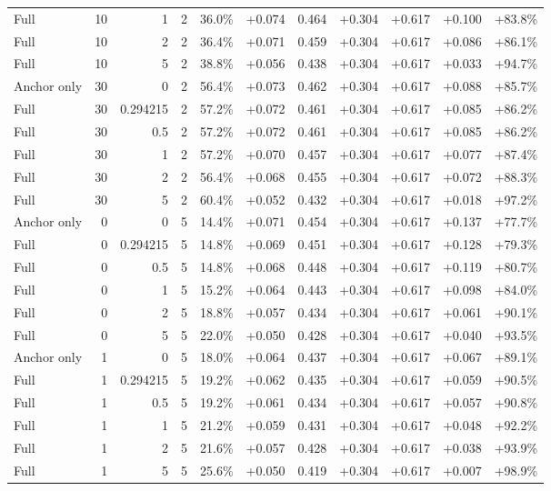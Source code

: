 \begin{table}[htbp]
\begin{tabular}{lrrrccccccc}
Full & 10 & 1 & 2 & 36.0\% & +0.074 & 0.464 & +0.304 & +0.617 & +0.100 & +83.8\% \\
Full & 10 & 2 & 2 & 36.4\% & +0.071 & 0.459 & +0.304 & +0.617 & +0.086 & +86.1\% \\
Full & 10 & 5 & 2 & 38.8\% & +0.056 & 0.438 & +0.304 & +0.617 & +0.033 & +94.7\% \\
Anchor only & 30 & 0 & 2 & 56.4\% & +0.073 & 0.462 & +0.304 & +0.617 & +0.088 & +85.7\% \\
Full & 30 & 0.294215 & 2 & 57.2\% & +0.072 & 0.461 & +0.304 & +0.617 & +0.085 & +86.2\% \\
Full & 30 & 0.5 & 2 & 57.2\% & +0.072 & 0.461 & +0.304 & +0.617 & +0.085 & +86.2\% \\
Full & 30 & 1 & 2 & 57.2\% & +0.070 & 0.457 & +0.304 & +0.617 & +0.077 & +87.4\% \\
Full & 30 & 2 & 2 & 56.4\% & +0.068 & 0.455 & +0.304 & +0.617 & +0.072 & +88.3\% \\
Full & 30 & 5 & 2 & 60.4\% & +0.052 & 0.432 & +0.304 & +0.617 & +0.018 & +97.2\% \\
Anchor only & 0 & 0 & 5 & 14.4\% & +0.071 & 0.454 & +0.304 & +0.617 & +0.137 & +77.7\% \\
Full & 0 & 0.294215 & 5 & 14.8\% & +0.069 & 0.451 & +0.304 & +0.617 & +0.128 & +79.3\% \\
Full & 0 & 0.5 & 5 & 14.8\% & +0.068 & 0.448 & +0.304 & +0.617 & +0.119 & +80.7\% \\
Full & 0 & 1 & 5 & 15.2\% & +0.064 & 0.443 & +0.304 & +0.617 & +0.098 & +84.0\% \\
Full & 0 & 2 & 5 & 18.8\% & +0.057 & 0.434 & +0.304 & +0.617 & +0.061 & +90.1\% \\
Full & 0 & 5 & 5 & 22.0\% & +0.050 & 0.428 & +0.304 & +0.617 & +0.040 & +93.5\% \\
Anchor only & 1 & 0 & 5 & 18.0\% & +0.064 & 0.437 & +0.304 & +0.617 & +0.067 & +89.1\% \\
Full & 1 & 0.294215 & 5 & 19.2\% & +0.062 & 0.435 & +0.304 & +0.617 & +0.059 & +90.5\% \\
Full & 1 & 0.5 & 5 & 19.2\% & +0.061 & 0.434 & +0.304 & +0.617 & +0.057 & +90.8\% \\
Full & 1 & 1 & 5 & 21.2\% & +0.059 & 0.431 & +0.304 & +0.617 & +0.048 & +92.2\% \\
Full & 1 & 2 & 5 & 21.6\% & +0.057 & 0.428 & +0.304 & +0.617 & +0.038 & +93.9\% \\
Full & 1 & 5 & 5 & 25.6\% & +0.050 & 0.419 & +0.304 & +0.617 & +0.007 & +98.9\% \\

\end{tabular}
\end{table}
